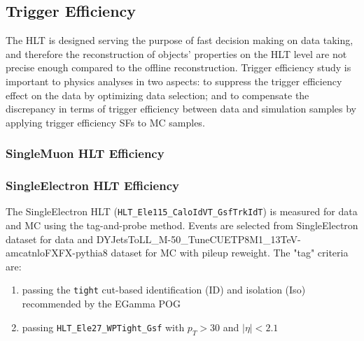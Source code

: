 \subsection{Trigger Efficiency}\label{sec:bkg_trig}
The HLT is designed serving the purpose of fast decision making on data taking, and therefore the reconstruction of objects' properties on the HLT level are not precise enough compared to the offline reconstruction. Trigger efficiency study is important to physics analyses in two aspects: to suppress the trigger efficiency effect on the data by optimizing data selection; and to compensate the discrepancy in terms of trigger efficiency between data and simulation samples by applying trigger efficiency SFs to MC samples.
\subsubsection{SingleMuon HLT Efficiency}

\subsubsection{SingleElectron HLT Efficiency}
The SingleElectron HLT (\texttt{HLT\_Ele115\_CaloIdVT\_GsfTrkIdT}) is measured for data and MC using the tag-and-probe method. Events are selected from SingleElectron dataset for data and DYJetsToLL\_M-50\_TuneCUETP8M1\_13TeV-amcatnloFXFX-pythia8 dataset for MC with pileup reweight. The "tag" criteria are:
\begin{enumerate}
\item passing the \texttt{tight} cut-based identification (ID) and isolation (Iso) recommended by the EGamma POG %
\item passing \texttt{HLT\_Ele27\_WPTight\_Gsf} with $p_T>30$ and $|\eta|<2.1$
\end{enumerate}


